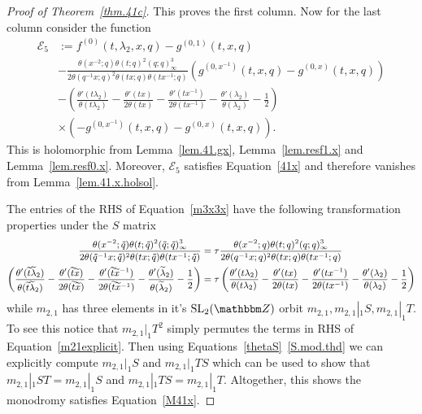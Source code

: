 \documentclass[12pt,reqno]{amsart}
\theoremstyle{definition}
\def\BZ{\mathbbm Z}
\def\calE{\mathcal E}
\def\ti{\widetilde}
\def\SL{\mathrm{SL}}
\def\tq{\tilde{q}}
\def\be{\begin{equation}}
\def\ee{\end{equation}}
\begin{document}
\begin{proof}[Proof of Theorem~\ref{thm.41c}]
This proves the first column. Now for the last column consider the function 
\be
\begin{aligned}
  \calE_{5}
  &:=
  f^{(0)}(t,\lambda_{2},x,q)
  -
  g^{(0,1)}(t,x,q)\\
  &-
  \frac{\theta(x^{-2};q)
    \theta(t;q)^2(q;q)_{\infty}^{3}}{2\theta(q^{-1}x;q)^2\theta(tx;q)
    \theta(tx^{-1};q)}\left(g^{(0,x^{-1})}(t,x,q)-g^{(0,x)}(t,x,q)\right)\\
  &-
  \left(\frac{\theta'(t\lambda_{2})}{\theta(t\lambda_{2})}
-\frac{\theta'(tx)}{2\theta(tx)}-\frac{\theta'(tx^{-1})}{2\theta(tx^{-1})}
-\frac{\theta'(\lambda_{2})}{\theta(\lambda_{2})}-\frac{1}{2}\right)
  \\ & \times 
  \left(-g^{(0,x^{-1})}(t,x,q)-g^{(0,x)}(t,x,q)\right).
\end{aligned}
\ee
This is holomorphic from Lemma~\ref{lem.41.gx}, Lemma~\ref{lem.resf1.x} and
Lemma~\ref{lem.resf0.x}. Moreover, $\calE_{5}$ satisfies Equation~\eqref{41x}
and therefore vanishes from Lemma~\ref{lem.41.x.holsol}.

The entries of the RHS
of Equation~\eqref{m3x3x} have the following transformation properties under
the $S$ matrix
\be
\begin{small}
\begin{aligned}
  \frac{\theta(x^{-2};\tq)
    \theta(t;\tq)^2(\tq;\tq)_{\infty}^{3}}{2\theta(\tq^{-1}x;\tq)^2
    \theta(tx;\tq)\theta(tx^{-1};\tq)}
  &=\tau\frac{\theta(x^{-2};q)
    \theta(t;q)^2(q;q)_{\infty}^3}{2\theta(q^{-1}x;q)^2\theta(tx;q)
    \theta(tx^{-1};q)}\\
  \left(\frac{\theta'(\ti t\ti \lambda_{2})}{\theta(\ti t\ti \lambda_{2})}
    -\frac{\theta'(\ti t\ti x)}{2\theta(\ti t\ti x)}
    -\frac{\theta'(\ti t\ti x^{-1})}{2\theta(\ti t\ti x^{-1})}
  -\frac{\theta'(\ti \lambda_{2})}{\theta(\ti \lambda_{2})}-\frac{1}{2}\right)
  &=\tau\left(\frac{\theta'(t\lambda_{2})}{\theta(t\lambda_{2})}
  -\frac{\theta'(tx)}{2\theta(tx)}-\frac{\theta'(tx^{-1})}{2\theta(tx^{-1})}
  -\frac{\theta'(\lambda_{2})}{\theta(\lambda_{2})}-\frac{1}{2}\right)\\
\end{aligned}
\end{small}
\ee
while $m_{2,1}$ has three elements in it's $\SL_{2}(\BZ)$ orbit
$m_{2,1},m_{2,1}|_{1}S,m_{2,1}|_{1}T$. To see this notice that $m_{2,1}|_{1}T^2$
simply permutes the terms in RHS of Equation~\eqref{m21explicit}. Then using
Equations~\eqref{thetaS}~\eqref{S.mod.thd} we can explicitly compute
$m_{2,1}|_{1}S$ and $m_{2,1}|_{1}TS$ which can be used to show that
$m_{2,1}|_{1}ST=m_{2,1}|_{1}S$ and $m_{2,1}|_{1}TS=m_{2,1}|_{1}T$.
Altogether, this shows the monodromy satisfies Equation~\eqref{M41x}.


\end{proof}
\end{document}
